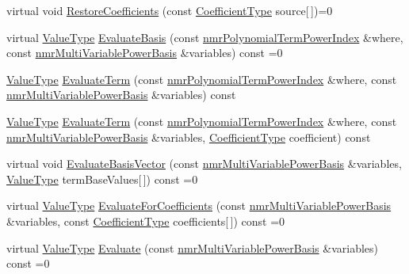 \begin{DoxyCompactItemize}
virtual void \hyperlink{classnmr_polynomial_base_a8e788ad20bd0571154016e52c8747c07}{Restore\-Coefficients} (const \hyperlink{classnmr_polynomial_base_a8693efdfc8585ccb49abea69f74f3eef}{Coefficient\-Type} source\mbox{[}$\,$\mbox{]})=0
\item 
virtual \hyperlink{classnmr_polynomial_base_a72f0bc16b225e4708bcf15a77ba206e3}{Value\-Type} \hyperlink{classnmr_polynomial_base_aee2e7c15f20165c2961a82f8eb0a2dc6}{Evaluate\-Basis} (const \hyperlink{classnmr_polynomial_term_power_index}{nmr\-Polynomial\-Term\-Power\-Index} \&where, const \hyperlink{classnmr_multi_variable_power_basis}{nmr\-Multi\-Variable\-Power\-Basis} \&variables) const =0
\item 
\hyperlink{classnmr_polynomial_base_a72f0bc16b225e4708bcf15a77ba206e3}{Value\-Type} \hyperlink{classnmr_polynomial_base_ae75be30b3efcf089f1af19f5e4c8befe}{Evaluate\-Term} (const \hyperlink{classnmr_polynomial_term_power_index}{nmr\-Polynomial\-Term\-Power\-Index} \&where, const \hyperlink{classnmr_multi_variable_power_basis}{nmr\-Multi\-Variable\-Power\-Basis} \&variables) const 
\item 
\hyperlink{classnmr_polynomial_base_a72f0bc16b225e4708bcf15a77ba206e3}{Value\-Type} \hyperlink{classnmr_polynomial_base_ad9406971e6ba806a5119aea07413ed03}{Evaluate\-Term} (const \hyperlink{classnmr_polynomial_term_power_index}{nmr\-Polynomial\-Term\-Power\-Index} \&where, const \hyperlink{classnmr_multi_variable_power_basis}{nmr\-Multi\-Variable\-Power\-Basis} \&variables, \hyperlink{classnmr_polynomial_base_a8693efdfc8585ccb49abea69f74f3eef}{Coefficient\-Type} coefficient) const 
\item 
virtual void \hyperlink{classnmr_polynomial_base_a8a52666a2ac9b19714aee3ca0da0194a}{Evaluate\-Basis\-Vector} (const \hyperlink{classnmr_multi_variable_power_basis}{nmr\-Multi\-Variable\-Power\-Basis} \&variables, \hyperlink{classnmr_polynomial_base_a72f0bc16b225e4708bcf15a77ba206e3}{Value\-Type} term\-Base\-Values\mbox{[}$\,$\mbox{]}) const =0
\item 
virtual \hyperlink{classnmr_polynomial_base_a72f0bc16b225e4708bcf15a77ba206e3}{Value\-Type} \hyperlink{classnmr_polynomial_base_a2536de8569d074248e1ddc892bb4cb6d}{Evaluate\-For\-Coefficients} (const \hyperlink{classnmr_multi_variable_power_basis}{nmr\-Multi\-Variable\-Power\-Basis} \&variables, const \hyperlink{classnmr_polynomial_base_a8693efdfc8585ccb49abea69f74f3eef}{Coefficient\-Type} coefficients\mbox{[}$\,$\mbox{]}) const =0
\item 
virtual \hyperlink{classnmr_polynomial_base_a72f0bc16b225e4708bcf15a77ba206e3}{Value\-Type} \hyperlink{classnmr_polynomial_base_a1df2433e0fe5c22d7d80934a10868a09}{Evaluate} (const \hyperlink{classnmr_multi_variable_power_basis}{nmr\-Multi\-Variable\-Power\-Basis} \&variables) const =0

\end{DoxyCompactItemize}
